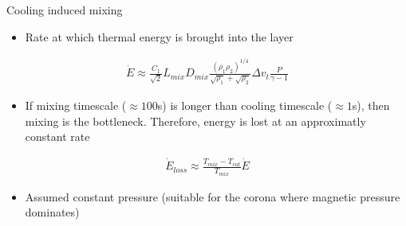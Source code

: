 \documentclass[10pt,aspectratio=169,usenames,dvipsnames]{beamer}
\begin{document}

\begin{frame}{Cooling induced mixing}
\begin{itemize}
    \item Rate at which thermal energy is brought into the layer
\end{itemize}
\begin{gather}
    \dot{E} \approx \frac{C_1}{\sqrt{2}} L_{mix} D_{mix} \frac{\left( \rho_1 \rho_2 \right)^{1/4}}{\sqrt{\rho_1}+\sqrt{\rho_2}} \Delta v_t \frac{P}{\gamma -1}
\end{gather}
\begin{itemize}
    \item If mixing timescale ($\approx 100$s) is longer than cooling timescale ($\approx 1$s), then mixing is the bottleneck. Therefore, energy is lost at an approximatly constant rate
\end{itemize}
\begin{gather}
    \dot{E}_{loss} \approx \frac{T_{mix}-T_{cut}}{T_{mix}} \dot{E}
\end{gather}
\begin{itemize}
    \item Assumed constant pressure (suitable for the corona where magnetic pressure dominates)
\end{itemize}
\end{frame}

\end{document}

